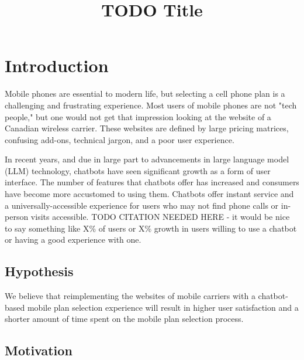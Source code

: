 \documentclass[conference]{IEEEtran}
\begin{document}
\title{TODO Title}
\author{
\and
{}
}

\maketitle


\section{Introduction}

Mobile phones are essential to modern life, but selecting a cell phone plan
is a challenging and frustrating experience. Most users of mobile phones are
not "tech people," but one would not get that impression looking at the
website of a Canadian wireless carrier. These websites are defined by large
pricing matrices, confusing add-ons, technical jargon, and a poor user
experience.

In recent years, and due in large part to advancements in large language
model (LLM) technology, chatbots have seen significant growth as a form of
user interface. The number of features that chatbots offer has increased
and consumers have become more accustomed to using them. Chatbots offer
instant service and a universally-accessible experience for users who may
not find phone calls or in-person visits accessible.
TODO CITATION NEEDED HERE - it would be nice to say something like X\% of
users or X\% growth in users willing to use a chatbot or having a good
experience with one.

\subsection{Hypothesis}

We believe that reimplementing the websites of mobile carriers with a
chatbot-based mobile plan selection experience will result in higher user
satisfaction and a shorter amount of time spent on the mobile plan selection
process.

\subsection{Motivation}
\end{document}
